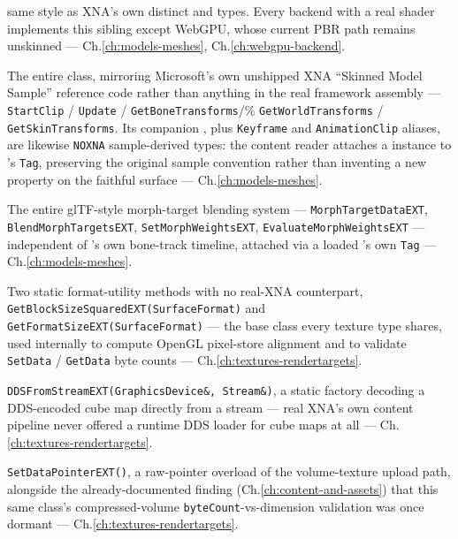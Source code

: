 \begin{description}
  same style as XNA's own distinct  and  types.
  Every backend with a real  shader implements this sibling except WebGPU,
  whose current PBR path remains unskinned --- Ch.\ref{ch:models-meshes}, Ch.\ref{ch:webgpu-backend}.
\item[\cnaclass{AnimationPlayer}] The entire class, mirroring Microsoft's own unshipped XNA
  ``Skinned Model Sample'' reference code rather than anything in the real framework assembly
  --- \texttt{StartClip} / \texttt{Update} / \texttt{GetBoneTransforms}/\%
  \texttt{GetWorldTransforms} / \texttt{GetSkinTransforms}. Its companion
  , plus \texttt{Keyframe} and \texttt{AnimationClip} aliases, are
  likewise \texttt{NOXNA} sample-derived types: the content reader attaches a
   instance to 's \texttt{Tag}, preserving the original
  sample convention rather than inventing a new property on the faithful 
  surface --- Ch.\ref{ch:models-meshes}.
\item[\cnaclass{MorphTargetEXT}] The entire glTF-style morph-target blending system ---
  \texttt{MorphTargetDataEXT}, \texttt{BlendMorphTargetsEXT}, \texttt{SetMorphWeightsEXT},
  \texttt{EvaluateMorphWeightsEXT} --- independent of 's own
  bone-track timeline, attached via a loaded 's own \texttt{Tag} ---
  Ch.\ref{ch:models-meshes}.
\item[\cnaclass{Texture}] Two static format-utility methods with no real-XNA counterpart,
  \texttt{GetBlockSizeSquaredEXT(SurfaceFormat)} and \texttt{GetFormatSizeEXT(SurfaceFormat)}
  --- the base class every texture type shares, used internally to compute OpenGL pixel-store
  alignment and to validate \texttt{SetData} / \texttt{GetData} byte counts --- Ch.\ref{ch:textures-rendertargets}.
\item[\cnaclass{TextureCube}] \texttt{DDSFromStreamEXT(GraphicsDevice\&, Stream\&)}, a static
  factory decoding a DDS-encoded cube map directly from a stream --- real XNA's own content
  pipeline never offered a runtime DDS loader for cube maps at all --- Ch.\ref{ch:textures-rendertargets}.
\item[\cnaclass{Texture3D}] \texttt{SetDataPointerEXT()}, a raw-pointer overload of the
  volume-texture upload path, alongside the already-documented finding (Ch.\ref{ch:content-and-assets}) that this same
  class's compressed-volume \texttt{byteCount}-vs-dimension validation was once dormant --- Ch.\ref{ch:textures-rendertargets}.

\end{description}
